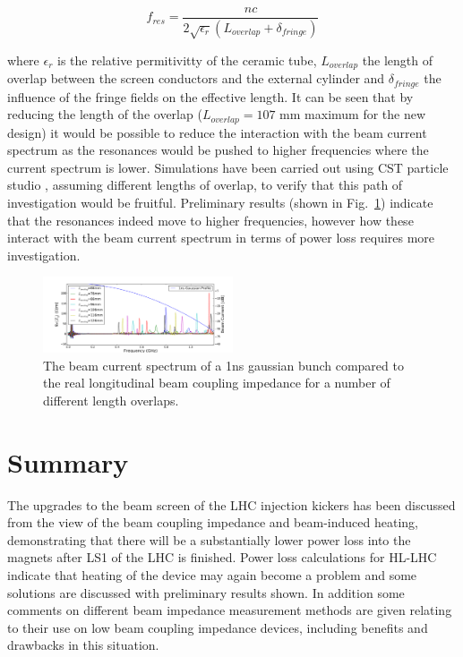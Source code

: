 \documentclass[a4paper,
              ]{jacow}
\begin{document}
\begin{equation}
f_{res} = \frac{n c}{2 \sqrt{\epsilon_{r}}\left( L_{overlap} + \delta_{fringe} \right)}
\end{equation}

where $\epsilon_{r}$ is the relative permitivitty of the ceramic tube, $L_{overlap}$ the length of overlap between the screen conductors and the external cylinder and $\delta_{fringe}$ the influence of the fringe fields on the effective length. It can be seen that by reducing the length of the overlap ($L_{overlap}=107$ mm maximum for the new design) it would be possible to reduce the interaction with the beam current spectrum as the resonances would be pushed to higher frequencies where the current spectrum is lower. Simulations have been carried out using CST particle studio \cite{cst-cite}, assuming different lengths of overlap, to verify that this path of investigation would be fruitful. Preliminary results (shown in Fig.~\ref{fig:overLapSpec}) indicate that the resonances indeed move to higher frequencies, however how these interact with the beam current spectrum in terms of power loss requires more investigation.

\begin{figure}
\includegraphics[width=0.5\textwidth]{TUPRI030f6.pdf}
\caption{The beam current spectrum of a 1ns gaussian bunch compared to the real longitudinal beam coupling impedance for a number of different length overlaps.}
\label{fig:overLapSpec}
\end{figure}

\section{Summary}

The upgrades to the beam screen of the LHC injection kickers has been discussed from the view of the beam coupling impedance and beam-induced heating, demonstrating that there will be a substantially lower power loss into the magnets after LS1 of the LHC is finished. Power loss calculations for HL-LHC indicate that heating of the device may again become a problem and some solutions are discussed with preliminary results shown. In addition some comments on different beam impedance measurement methods are given relating to their use on low beam coupling impedance devices, including benefits and drawbacks in this situation.
\end{document}
